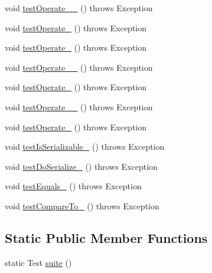 \begin{DoxyCompactItemize}
\item 
void \hyperlink{classorg_1_1jgap_1_1impl_1_1_mutation_operator_test_a34bd219fb0f70e65c3de98f214c8e279}{test\-Operate\-\_\-\_} ()  throws Exception 
\item 
void \hyperlink{classorg_1_1jgap_1_1impl_1_1_mutation_operator_test_af36ffa441c4645ddb757d0611f3cdc6d}{test\-Operate\-\_} ()  throws Exception 
\item 
void \hyperlink{classorg_1_1jgap_1_1impl_1_1_mutation_operator_test_a95102b25c80ea45e5cad854b2a28eeda}{test\-Operate\-\_} ()  throws Exception 
\item 
void \hyperlink{classorg_1_1jgap_1_1impl_1_1_mutation_operator_test_ae607d822ca8c46834e8c3292310fe200}{test\-Operate\-\_\-\_} ()  throws Exception 
\item 
void \hyperlink{classorg_1_1jgap_1_1impl_1_1_mutation_operator_test_a7f540e7af379c31b488899740c9c4ecb}{test\-Operate\-\_} ()  throws Exception 
\item 
void \hyperlink{classorg_1_1jgap_1_1impl_1_1_mutation_operator_test_ab2ea7a8d8439a42120bee2605af92d53}{test\-Operate\-\_\-\_} ()  throws Exception 
\item 
void \hyperlink{classorg_1_1jgap_1_1impl_1_1_mutation_operator_test_a5aaf5d8acf4eb020ca676d1103af5286}{test\-Operate\-\_} ()  throws Exception 
\item 
void \hyperlink{classorg_1_1jgap_1_1impl_1_1_mutation_operator_test_aa0c33aac08ee8962e817015fa92b64f4}{test\-Is\-Serializable\-\_} ()  throws Exception 
\item 
void \hyperlink{classorg_1_1jgap_1_1impl_1_1_mutation_operator_test_a6ede204d5814d503bf146ab032b942e1}{test\-Do\-Serialize\-\_} ()  throws Exception 
\item 
void \hyperlink{classorg_1_1jgap_1_1impl_1_1_mutation_operator_test_a765478b6a080889a2893c2f9e6935e8c}{test\-Equals\-\_} ()  throws Exception 
\item 
void \hyperlink{classorg_1_1jgap_1_1impl_1_1_mutation_operator_test_a246ff145aa18b78f2ec32e71d3fc9b14}{test\-Compare\-To\-\_} ()  throws Exception 
\end{DoxyCompactItemize}
\subsection*{Static Public Member Functions}
\begin{DoxyCompactItemize}
\item 
static Test \hyperlink{classorg_1_1jgap_1_1impl_1_1_mutation_operator_test_a7f95d67a58557d80839d32b0d90da67c}{suite} ()
\end{DoxyCompactItemize}
